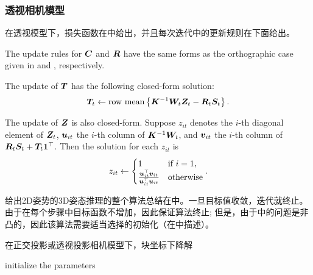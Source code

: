 \subsubsection{透视相机模型}


在透视模型下，损失函数在中给出，并且每次迭代中的更新规则在下面给出。

The update rules for ${\bm{C}}$ and ${\bm{R}}$ have the same forms as the orthographic case given in  and , respectively.

The update of ${\bm{T}}$ has the following closed-form solution:
\begin{align}\label{eq:T-step-fp}
{\bm{T}}_t \leftarrow \mbox{row mean}\left\{{\bm{K}}^{-1}{\bm{W}}_t{\bm{Z}}_t - {\bm{R}}_t{\bm{S}}_t\right\}.
\end{align}

The update of ${\bm{Z}}$ is also closed-form. Suppose $z_{it}$ denotes the $i$-th diagonal element of ${\bm{Z}}_t$, ${\bm{u}}_{it}$ the $i$-th column of ${\bm{K}}^{-1}{\bm{W}}_t$, and ${\bm{v}}_{it}$ the $i$-th column of ${\bm{R}}_t{\bm{S}}_t+{\bm{T}}_t{\bm{1}}^\top$. Then the solution for each $z_{it}$ is  
\begin{align}\label{eq:Z-step}
z_{it}\leftarrow 
\begin{cases}
     1 & \mbox{if $i=1$}, \\
    \frac{{\bm{u}}_{it}^\top{\bm{v}}_{it}}{{\bm{u}}_{it}^\top{\bm{u}}_{it}} & \mbox{otherwise}
\end{cases}.
\end{align}

给出2D姿势的3D姿态推理的整个算法总结在中。一旦目标值收敛，迭代就终止。由于在每个步骤中目标函数不增加，因此保证算法终止; 但是，由于中的问题是非凸的，因此该算法需要适当选择的初始化（在中描述）。

\begin{algorithm}[t]\label{alg:bcd}
\LinesNumbered
\caption{在正交投影或透视投影相机模型下，块坐标下降解}
\vspace{0.3em}
\vspace{0.3em}
initialize the parameters 
\end{algorithm}

